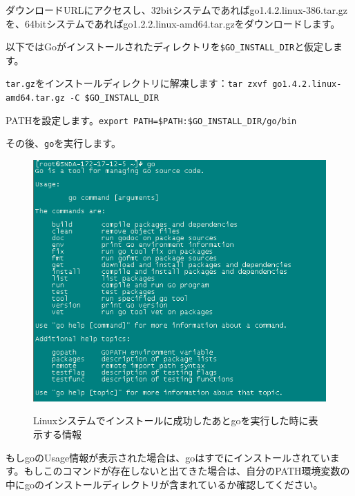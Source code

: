 ダウンロードURLにアクセスし、32bitシステムであればgo1.4.2.linux-386.tar.gzを、64bitシステムであればgo1.2.2.linux-amd64.tar.gzをダウンロードします。

以下ではGoがインストールされたディレクトリを\texttt{\$GO\_INSTALL\_DIR}と仮定します。

\texttt{tar.gz}をインストールディレクトリに解凍します：\texttt{tar zxvf go1.4.2.linux-amd64.tar.gz -C \$GO\_INSTALL\_DIR}

PATHを設定します。\texttt{export PATH=\$PATH:\$GO\_INSTALL\_DIR\//go\//bin}

その後、\texttt{go}を実行します。

\begin{figure}[H]
  \includegraphics[width=14cm]{1.1.linux.png}
   \label{図1.2}
   \caption{Linuxシステムでインストールに成功したあとgoを実行した時に表示する情報}
\end{figure}

もしgoのUsage情報が表示された場合は、goはすでにインストールされています。もしこのコマンドが存在しないと出てきた場合は、自分のPATH環境変数の中にgoのインストールディレクトリが含まれているか確認してください。

